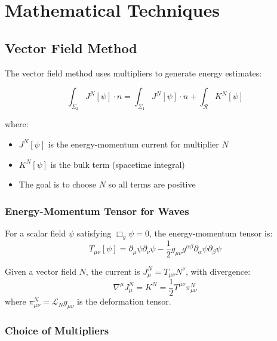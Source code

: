 \documentclass[12pt,a4paper]{article}
\begin{document}
\section{Mathematical Techniques}

\subsection{Vector Field Method}

The vector field method uses multipliers to generate energy estimates:

\begin{equation}
\int_{\Sigma_2} J^N[\psi] \cdot n = \int_{\Sigma_1} J^N[\psi] \cdot n + \int_{\mathcal{R}} K^N[\psi]
\end{equation}

where:
\begin{itemize}
    \item $J^N[\psi]$ is the energy-momentum current for multiplier $N$
    \item $K^N[\psi]$ is the bulk term (spacetime integral)
    \item The goal is to choose $N$ so all terms are positive
\end{itemize}

\subsubsection{Energy-Momentum Tensor for Waves}

For a scalar field $\psi$ satisfying $\Box_g \psi = 0$, the energy-momentum tensor is:
\begin{equation}
T_{\mu\nu}[\psi] = \partial_\mu \psi \partial_\nu \psi - \frac{1}{2}g_{\mu\nu}g^{\alpha\beta}\partial_\alpha\psi\partial_\beta\psi
\end{equation}

Given a vector field $N$, the current is $J^N_\mu = T_{\mu\nu}N^\nu$, with divergence:
\begin{equation}
\nabla^\mu J^N_\mu = K^N = \frac{1}{2}T^{\mu\nu}\pi^N_{\mu\nu}
\end{equation}
where $\pi^N_{\mu\nu} = \mathcal{L}_N g_{\mu\nu}$ is the deformation tensor.

\subsubsection{Choice of Multipliers}
\end{document}
